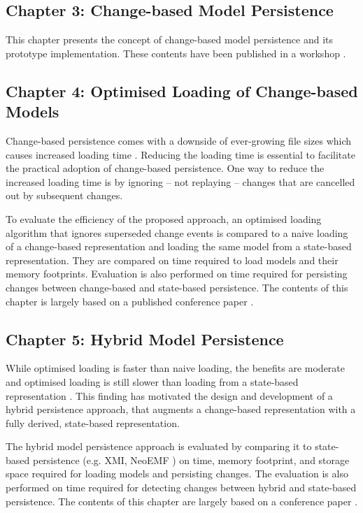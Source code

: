 \subsection{Chapter 3: Change-based Model Persistence}
\label{sec:chapter_3_Change-based_model_ersistence_plan}
This chapter presents the concept of change-based model persistence and its prototype implementation. These contents have been published in a workshop \cite{DBLP:conf/models/YohannisKP17}.

\subsection{Chapter 4: Optimised Loading of Change-based Models}
\label{sec:chapter_4_optimised_loading_change_based_model_persistence}

Change-based persistence comes with a downside of ever-growing file sizes \cite{DBLP:journals/entcs/RobbesL07,DBLP:conf/edoc/KoegelHLHD10} which causes increased loading time \cite{mens2002state}. Reducing the loading time is essential to facilitate the practical adoption of change-based persistence. One way to reduce the increased loading time is by ignoring -- not replaying -- changes that are cancelled out by subsequent changes. 

To evaluate the efficiency of the proposed approach, an optimised loading algorithm that ignores superseded change events is compared to a naive loading of a change-based representation and loading the same model from a state-based representation. They are compared on time required to load models and their memory footprints. Evaluation is also performed on time required for persisting changes between change-based and state-based persistence. The contents of this chapter is largely based on a published conference paper \cite{yohannis2018towards}. 

\subsection{Chapter 5: Hybrid Model Persistence}
\label{sec:chapter_5_hybrid_model_persistence}
While optimised loading is faster than naive loading, the benefits are moderate and optimised loading is still slower than loading from a state-based representation \cite{DBLP:conf/models/YohannisRPK18}. This finding has motivated the design and development of a hybrid persistence approach, that augments a change-based representation with a fully derived, state-based representation. 

The hybrid model persistence approach is evaluated by comparing it to state-based persistence (e.g. XMI, NeoEMF \cite{daniel2016neoemf}) on time, memory footprint, and storage space required for loading models and persisting changes. The evaluation is also performed on time required for detecting changes between hybrid and state-based persistence. The contents of this chapter are largely based on a conference paper \cite{DBLP:conf/models/YohannisRPK18}.

